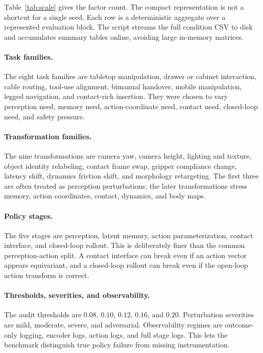 \documentclass{article}
\begin{document}
\begin{table}[t]
\centering
\small
\resizebox{\linewidth}{!}{}
\caption{Full-scale benchmark size. Rows are streamed and summarized online to keep RAM use small.}
\label{tab:scale}
\end{table}

Table~\ref{tab:scale} gives the factor count. The compact representation is not a shortcut for a single seed. Each row is a deterministic aggregate over a represented evaluation block. The script streams the full condition CSV to disk and accumulates summary tables online, avoiding large in-memory matrices.

\paragraph{Task families.}
The eight task families are tabletop manipulation, drawer or cabinet interaction, cable routing, tool-use alignment, bimanual handover, mobile manipulation, legged navigation, and contact-rich insertion. They were chosen to vary perception need, memory need, action-coordinate need, contact need, closed-loop need, and safety pressure.

\paragraph{Transformation families.}
The nine transformations are camera yaw, camera height, lighting and texture, object identity relabeling, contact frame swap, gripper compliance change, latency shift, dynamics friction shift, and morphology retargeting. The first three are often treated as perception perturbations; the later transformations stress memory, action coordinates, contact, dynamics, and body maps.

\paragraph{Policy stages.}
The five stages are perception, latent memory, action parameterization, contact interface, and closed-loop rollout. This is deliberately finer than the common perception-action split. A contact interface can break even if an action vector appears equivariant, and a closed-loop rollout can break even if the open-loop action transform is correct.

\paragraph{Thresholds, severities, and observability.}
The audit thresholds are $0.08$, $0.10$, $0.12$, $0.16$, and $0.20$. Perturbation severities are mild, moderate, severe, and adversarial. Observability regimes are outcome-only logging, encoder logs, action logs, and full stage logs. This lets the benchmark distinguish true policy failure from missing instrumentation.
\end{document}
